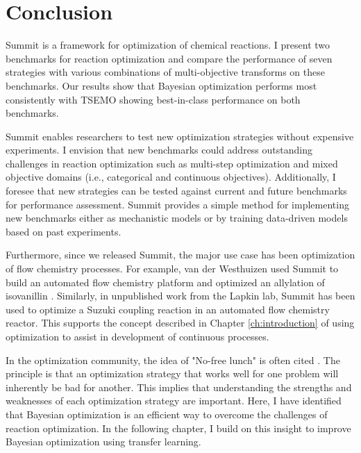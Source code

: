 \section{Conclusion}

Summit is a framework for optimization of chemical reactions. I present two benchmarks for reaction optimization and compare the performance of seven strategies with various combinations of multi-objective transforms on these benchmarks. Our results show that Bayesian optimization performs most consistently with TSEMO showing best-in-class performance on both benchmarks.

Summit enables researchers to test new optimization strategies without expensive experiments. I envision that new benchmarks could address outstanding challenges in reaction optimization such as multi-step optimization \cite{Coley2019, Clayton2020} and mixed objective domains (i.e., categorical and continuous objectives). Additionally, I foresee that new strategies can be tested against current and future benchmarks for performance assessment. Summit provides a simple method for implementing new benchmarks either as mechanistic models or by training data-driven models based on past experiments.

Furthermore, since we released Summit, the major use case has been optimization of flow chemistry processes. For example, van der Westhuizen used Summit to build an automated flow chemistry platform and optimized an allylation of isovanillin \cite{Van2022}. Similarly, in unpublished work from the Lapkin lab, Summit has been used to optimize a Suzuki coupling reaction in an automated flow chemistry reactor. This supports the concept described in Chapter \ref{ch:introduction} of using optimization to assist in development of continuous processes.

In the optimization community, the idea of "No-free lunch" is often cited \cite{Wolpert1997}. The principle is that an optimization strategy that works well for one problem will inherently be bad for another.  This implies that understanding the strengths and weaknesses of each optimization strategy are important. Here, I have identified that Bayesian optimization is an efficient way to overcome the challenges of reaction optimization. In the following chapter, I build on this insight to improve Bayesian optimization using transfer learning.
